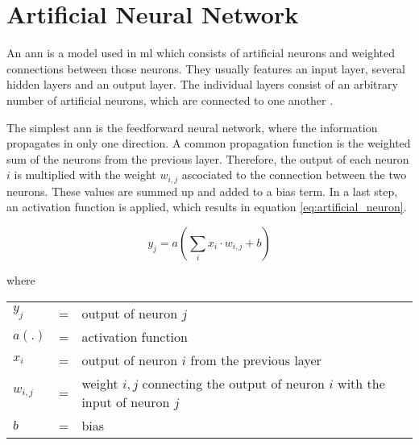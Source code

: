 \section{Artificial Neural Network}
\label{sec:theoretical_background:ann}

An \acrlong{ann} is a model used in \acrshort{ml} which consists of artificial neurons and weighted connections between those neurons.
They usually features an input layer, several hidden layers and an output layer.
The individual layers consist of an arbitrary number of artificial neurons, which are connected to one another \cite[p.~33-36]{nn}.

The simplest \acrshort{ann} is the feedforward neural network, where the information propagates in only one direction.
A common propagation function is the weighted sum of the neurons from the previous layer.
Therefore, the output of each neuron $i$ is multiplied with the weight $w_{i, j}$ ascociated to the connection between the two neurons.
These values are summed up and added to a bias term.
In a last step, an activation function is applied, which results in equation \ref{eq:artificial_neuron}.

\begin{equation}
  y_j = a\left(\sum\limits_{i} x_i \cdot w_{i, j} + b\right)
  \label{eq:artificial_neuron}
\end{equation}

where

\begin{tabular}{lll}
  $y_j$ & = & output of neuron $j$ \\
  $a(.)$ & = & activation function \\
  $x_i$ & = & output of neuron $i$ from the previous layer \\
  $w_{i, j}$ & = & weight $i, j$ connecting the output of neuron $i$ with the input of neuron $j$ \\
  $b$ & = & bias \\
\end{tabular}
\\




